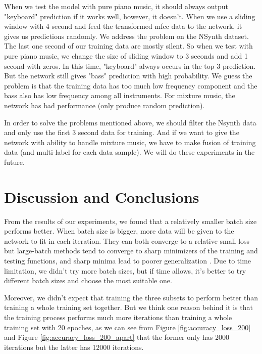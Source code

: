 \documentclass{article}
\begin{document}
\noindent When we test the model with pure piano music, it should always output "keyboard" prediction if it works well, however, it doesn't. When we use a sliding window with 4 second and feed the transformed mfcc data to the network, it gives us predictions randomly. We address the problem on the NSynth dataset. The last one second of our training data are mostly silent. So when we test with pure piano music, we change the size of sliding window to 3 seconds and add 1 second with zeros. In this time, "keyboard" always occurs in the top 3 prediction. But the network still gives "bass" prediction with high probability. We guess the problem is that the training data has too much low frequency component and the bass also has low frequency among all instruments. For mixture music, the network has bad performance (only produce random prediction).

\noindent In order to solve the problems mentioned above, we should filter the Nsynth data and only use the first 3 second data for training. And if we want to give the network with ability to handle mixture music, we have to make fusion of training data (and multi-label for each data sample). We will do these experiments in the future.

\section{Discussion and Conclusions}

From the results of our experiments, we found that a relatively smaller batch size performs better. When batch size is bigger, more data will be given to the network to fit in each iteration. They can both converge to a relative small loss but large-batch methods tend to converge to sharp minimizers of the training and testing functions, and sharp minima lead to poorer generalization \cite{keskar}. Due to time limitation, we didn't try more batch sizes, but if time allows, it's better to try different batch sizes and choose the most suitable one.

\noindent Moreover, we didn't expect that training the three subsets to perform better than training a whole training set together. But we think one reason behind it is that the training process performs much more iterations than training a whole training set with 20 epoches, as we can see from Figure \ref{fig:accuracy_loss_200} and Figure \ref{fig:accuracy_loss_200_apart} that the former only has 2000 iterations but the latter has 12000 iterations.
\end{document}
